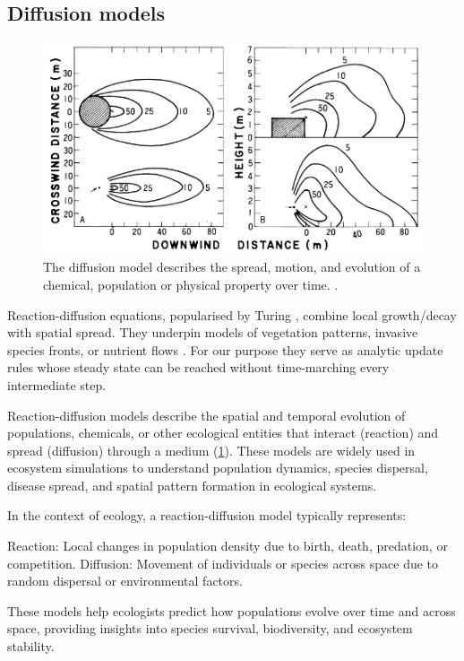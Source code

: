 \subsection{Diffusion models}

\begin{figure}[H]
    \centering
    \includegraphics[]{diffusion-example-Okubo2001.png}
    \caption{The diffusion model describes the spread, motion, and evolution of a chemical, population or physical property over time. \cite{Okubo2001}.}
    \label{fig:diffusion-model-teaser}
\end{figure}

Reaction-diffusion equations, popularised by Turing \cite{Turing1952}, combine local growth/decay with spatial spread. They underpin models of vegetation patterns, invasive species fronts, or nutrient flows \cite{Cosner2008}. For our purpose they serve as analytic update rules whose steady state can be reached without time-marching every intermediate step.

Reaction-diffusion models describe the spatial and temporal evolution of populations, chemicals, or other ecological entities that interact (reaction) and spread (diffusion) through a medium (\cref{fig:diffusion-model-teaser}). These models are widely used in ecosystem simulations to understand population dynamics, species dispersal, disease spread, and spatial pattern formation in ecological systems.

In the context of ecology, a reaction-diffusion model typically represents:
\begin{Itemize}
    \Item{} Reaction: Local changes in population density due to birth, death, predation, or competition.
    \Item{} Diffusion: Movement of individuals or species across space due to random dispersal or environmental factors.
\end{Itemize}
These models help ecologists predict how populations evolve over time and across space, providing insights into species survival, biodiversity, and ecosystem stability.

